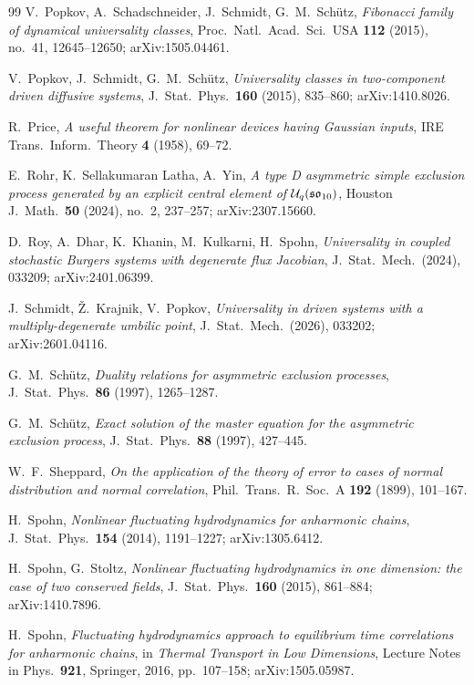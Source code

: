 \documentclass[11pt]{article}
\theoremstyle{plain}
\theoremstyle{definition}
\theoremstyle{remark}
\begin{document}
\begin{thebibliography}{99}
 V.~Popkov, A.~Schadschneider, J.~Schmidt, G.~M.~Sch\"utz,
\emph{Fibonacci family of dynamical universality classes},
Proc.~Natl.~Acad.~Sci.~USA \textbf{112} (2015), no.~41, 12645--12650; arXiv:1505.04461.

 V.~Popkov, J.~Schmidt, G.~M.~Sch\"utz, \emph{Universality classes in
two-component driven diffusive systems}, J.~Stat.~Phys.~\textbf{160} (2015),
835--860; arXiv:1410.8026.

 R.~Price, \emph{A useful theorem for nonlinear devices having Gaussian
inputs}, IRE Trans.~Inform.~Theory \textbf{4} (1958), 69--72.

 E.~Rohr, K.~Sellakumaran Latha, A.~Yin, \emph{A type D asymmetric simple
exclusion process generated by an explicit central element of
$\mathcal U_q(\mathfrak{so}_{10})$}, Houston J.~Math.~\textbf{50} (2024), no.~2, 237--257;
arXiv:2307.15660.

 D.~Roy, A.~Dhar, K.~Khanin, M.~Kulkarni, H.~Spohn, \emph{Universality
in coupled stochastic Burgers systems with degenerate flux Jacobian},
J.~Stat.~Mech.~(2024), 033209; arXiv:2401.06399.

 J.~Schmidt, \v Z.~Krajnik, V.~Popkov, \emph{Universality in driven
systems with a multiply-degenerate umbilic point}, J.~Stat.~Mech.~(2026), 033202;
arXiv:2601.04116.

 G.~M.~Sch\"utz, \emph{Duality relations for asymmetric exclusion
processes}, J.~Stat.~Phys.~\textbf{86} (1997), 1265--1287.

 G.~M.~Sch\"utz, \emph{Exact solution of the master equation for the
asymmetric exclusion process}, J.~Stat.~Phys.~\textbf{88} (1997), 427--445.

 W.~F.~Sheppard, \emph{On the application of the theory of error to cases
of normal distribution and normal correlation}, Phil.~Trans.~R.~Soc.~A \textbf{192}
(1899), 101--167.

 H.~Spohn, \emph{Nonlinear fluctuating hydrodynamics for
anharmonic chains}, J.~Stat.~Phys.~\textbf{154} (2014), 1191--1227; arXiv:1305.6412.

 H.~Spohn, G.~Stoltz, \emph{Nonlinear fluctuating
hydrodynamics in one dimension: the case of two conserved fields},
J.~Stat.~Phys.~\textbf{160} (2015), 861--884; arXiv:1410.7896.

 H.~Spohn, \emph{Fluctuating hydrodynamics approach to
equilibrium time correlations for anharmonic chains}, in \emph{Thermal Transport
in Low Dimensions}, Lecture Notes in Phys.~\textbf{921}, Springer, 2016,
pp.~107--158; arXiv:1505.05987.


\end{thebibliography}
\end{document}
